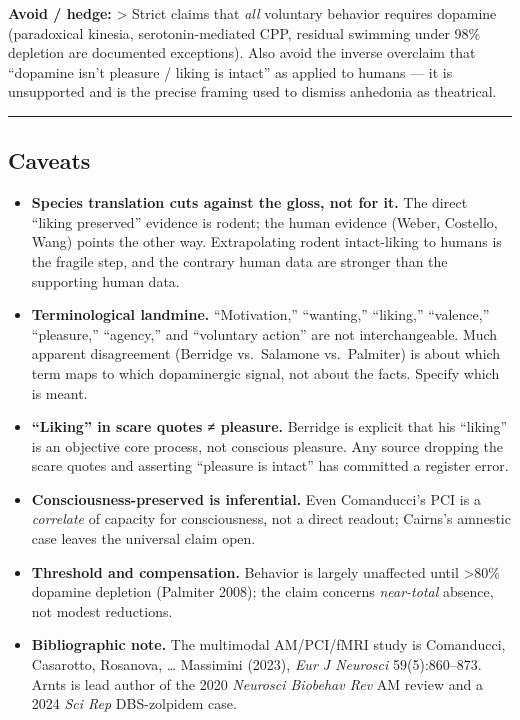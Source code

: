 \textbf{Avoid / hedge:} \textgreater{} Strict claims that \emph{all} voluntary behavior requires dopamine (paradoxical kinesia, serotonin-mediated CPP, residual swimming under 98\% depletion are documented exceptions). Also avoid the inverse overclaim that ``dopamine isn't pleasure / liking is intact'' as applied to humans --- it is unsupported and is the precise framing used to dismiss anhedonia as theatrical.

\begin{center}\rule{0.5\linewidth}{0.5pt}\end{center}

\subsection{Caveats}\label{02_dopamine_action-caveats}

\begin{itemize}
\tightlist
\item
  \textbf{Species translation cuts against the gloss, not for it.} The direct ``liking preserved'' evidence is rodent; the human evidence (Weber, Costello, Wang) points the other way. Extrapolating rodent intact-liking to humans is the fragile step, and the contrary human data are stronger than the supporting human data.
\item
  \textbf{Terminological landmine.} ``Motivation,'' ``wanting,'' ``liking,'' ``valence,'' ``pleasure,'' ``agency,'' and ``voluntary action'' are not interchangeable. Much apparent disagreement (Berridge vs.~Salamone vs.~Palmiter) is about which term maps to which dopaminergic signal, not about the facts. Specify which is meant.
\item
  \textbf{``Liking'' in scare quotes ≠ pleasure.} Berridge is explicit that his ``liking'' is an objective core process, not conscious pleasure. Any source dropping the scare quotes and asserting ``pleasure is intact'' has committed a register error.
\item
  \textbf{Consciousness-preserved is inferential.} Even Comanducci's PCI is a \emph{correlate} of capacity for consciousness, not a direct readout; Cairns's amnestic case leaves the universal claim open.
\item
  \textbf{Threshold and compensation.} Behavior is largely unaffected until \textgreater80\% dopamine depletion (Palmiter 2008); the claim concerns \emph{near-total} absence, not modest reductions.
\item
  \textbf{Bibliographic note.} The multimodal AM/PCI/fMRI study is Comanducci, Casarotto, Rosanova, \ldots{} Massimini (2023), \emph{Eur J Neurosci} 59(5):860--873. Arnts is lead author of the 2020 \emph{Neurosci Biobehav Rev} AM review and a 2024 \emph{Sci Rep} DBS-zolpidem case.
\end{itemize}
